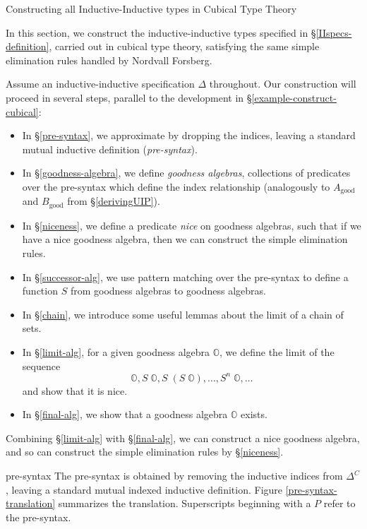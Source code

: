 \documentclass[acmsmall,review]{acmart}\settopmatter{printfolios=true,printccs=false,printacmref=false}
\newcommand{\good}[1]{{#1}_\text{good}}
\newcommand{\bbO}{\mathbb{O}}
\def\Forsberg/{Nordvall Forsberg}
\begin{document}
\begin{section}{Constructing all Inductive-Inductive types in Cubical Type Theory}\label{construct-cubical}

In this section, we construct the inductive-inductive types specified in \S\ref{IIspecs-definition}, carried out in cubical type theory, satisfying the same simple elimination rules handled by \Forsberg/.

Assume an inductive-inductive specification $\Delta$ throughout. Our construction will proceed in several steps, parallel to the development in \S\ref{example-construct-cubical}:
\begin{itemize}
    \item In \S\ref{pre-syntax}, we approximate by dropping the indices, leaving a standard mutual inductive definition (\emph{pre-syntax}).
    \item In \S\ref{goodness-algebra}, we define \emph{goodness algebras}, collections of predicates over the pre-syntax which define the index relationship (analogously to $\good{A}$ and $\good{B}$ from \S\ref{derivingUIP}).
    \item In \S\ref{niceness}, we define a predicate \emph{nice} on goodness algebras, such that if we have a nice goodness algebra, then we can construct the simple elimination rules.
    \item In \S\ref{successor-alg}, we use pattern matching over the pre-syntax to define a function $S$ from goodness algebras to goodness algebras.
    \item In \S\ref{chain}, we introduce some useful lemmas about the limit of a chain of sets.
    \item In \S\ref{limit-alg}, for a given goodness algebra $\bbO$, we define the limit of the sequence \[\bbO, S\;\bbO, S\;(S\;\bbO), \dots, S^n\;\bbO,\dots\] and show that it is nice.
    \item In \S\ref{final-alg}, we show that a goodness algebra $\bbO$ exists.
\end{itemize}
Combining \S\ref{limit-alg} with \S\ref{final-alg}, we can construct a nice goodness algebra, and so can construct the simple elimination rules by \S\ref{niceness}.

\begin{subsection}{pre-syntax}\label{pre-syntax}
The pre-syntax is obtained by removing the inductive indices from $\Delta^C$, leaving a standard mutual indexed inductive definition.
Figure \ref{pre-syntax-translation} summarizes the translation. Superscripts beginning with a $P$ refer to the pre-syntax.


\end{subsection}
\end{section}
\end{document}

